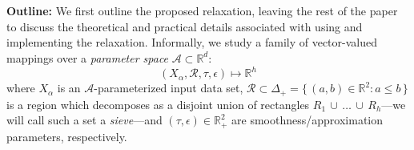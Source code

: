 \documentclass[10pt]{article}
\numberwithin{equation}{section}
\newcommand{\+}{%
	\raisebox{0.18ex}{\scaleobj{0.55}{+}}
}
\theoremstyle{definition}
\theoremstyle{definition}
\begin{document}
%
\\
\\
\noindent \textbf{Outline:} We first outline the proposed relaxation, leaving the rest of the paper to discuss the theoretical and practical details associated with using and implementing the relaxation. Informally, we study a family of vector-valued mappings over a \emph{parameter space} $\mathcal{A} \subset \mathbb{R}^d$: 
\begin{equation}\label{eq:relaxation_mapping}
	(X_\alpha, \mathcal{R}, \tau, \epsilon) \mapsto \mathbb{R}^{h}
\end{equation}
where $X_\alpha$ is an $\mathcal{A}$-parameterized input data set, $\mathcal{R} \subset \Delta_+  = \{\, (a,b) \in \mathbb{R}^2 : a \leq b \,\}$ is a region which decomposes as a disjoint union of rectangles $R_1 \, \cup \, \dots \, \cup \, R_h$---we will call such a set a \emph{sieve}---and $(\tau, \epsilon) \in \mathbb{R}_+^2$ are smoothness/approximation parameters, respectively.
\end{document}
